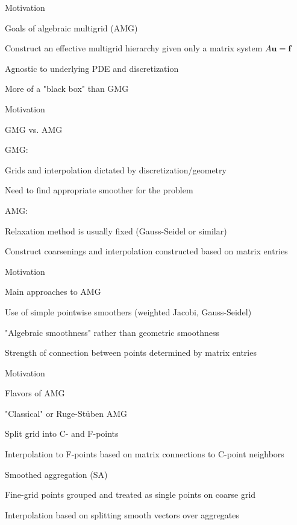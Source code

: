 \documentclass[18pt,xcolor=table]{beamer}
\begin{document}
\begin{frame}{Motivation}
\begin{block}{Goals of algebraic multigrid (AMG)}
\bit
\item Construct an effective multigrid hierarchy given only a matrix system $A\mathbf{u} = \mathbf{f}$
\item Agnostic to underlying PDE and discretization
\item More of a "black box" than GMG
\eit
\end{block}
\end{frame}

\begin{frame}{Motivation}
\begin{block}{GMG vs. AMG}
\bit
\item GMG:
\bit
\item Grids and interpolation dictated by discretization/geometry
\item Need to find appropriate smoother for the problem
\eit
\item AMG:
\bit
\item Relaxation method is usually fixed (Gauss-Seidel or similar)
\item Construct coarsenings and interpolation constructed based on matrix entries
\eit
\eit
\end{block}
\end{frame}

\begin{frame}{Motivation}
\begin{block}{Main approaches to AMG}
\bit
\item Use of simple pointwise smoothers (weighted Jacobi, Gauss-Seidel)
\item "Algebraic smoothness" rather than geometric smoothness
\item Strength of connection between points determined by matrix entries
\eit
\end{block}
\end{frame}

\begin{frame}{Motivation}
\begin{block}{Flavors of AMG}
\bit
\item "Classical" or Ruge-St\"uben AMG
\bit
\item Split grid into C- and F-points
\item Interpolation to F-points based on matrix connections to C-point neighbors
\eit
\item Smoothed aggregation (SA)
\bit
\item Fine-grid points grouped and treated as single points on coarse grid
\item Interpolation based on splitting smooth vectors over aggregates
\eit
\eit
\end{block}
\end{frame}
\end{document}
